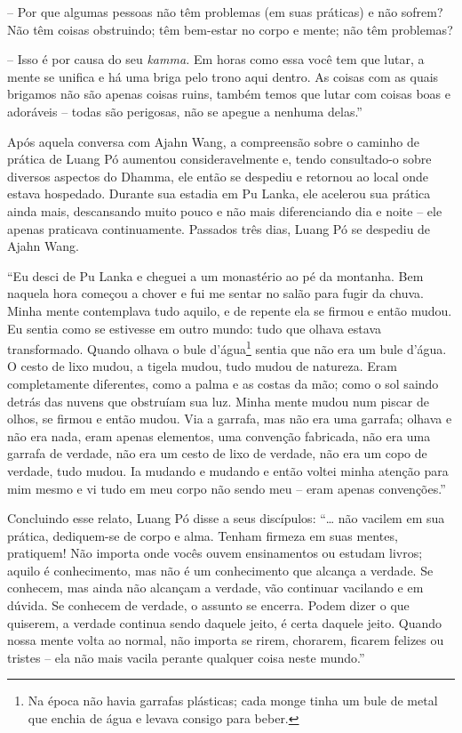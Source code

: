 -- Por que algumas pessoas não têm problemas (em suas práticas) e não
sofrem? Não têm coisas obstruindo; têm bem-estar no corpo e mente; não
têm problemas?

-- Isso é por causa do seu \emph{kamma.} Em horas como essa você tem que
lutar, a mente se unifica e há uma briga pelo trono aqui dentro. As
coisas com as quais brigamos não são apenas coisas ruins, também temos
que lutar com coisas boas e adoráveis -- todas são perigosas, não se
apegue a nenhuma delas.''

Após aquela conversa com Ajahn Wang, a compreensão sobre o caminho de
prática de Luang Pó aumentou consideravelmente e, tendo consultado-o
sobre diversos aspectos do Dhamma, ele então se despediu e retornou ao
local onde estava hospedado. Durante sua estadia em Pu Lanka, ele
acelerou sua prática ainda mais, descansando muito pouco e não mais
diferenciando dia e noite -- ele apenas praticava continuamente.
Passados três dias, Luang Pó se despediu de Ajahn Wang.

``Eu desci de Pu Lanka e cheguei a um monastério ao pé da montanha. Bem
naquela hora começou a chover e fui me sentar no salão para fugir da
chuva. Minha mente contemplava tudo aquilo, e de repente ela se firmou e
então mudou. Eu sentia como se estivesse em outro mundo: tudo que olhava
estava transformado. Quando olhava o bule d'água\footnote{Na época não
  havia garrafas plásticas; cada monge tinha um bule de metal que enchia
  de água e levava consigo para beber.} sentia que não era um bule
d'água. O cesto de lixo mudou, a tigela mudou, tudo mudou de natureza.
Eram completamente diferentes, como a palma e as costas da mão; como o
sol saindo detrás das nuvens que obstruíam sua luz. Minha mente mudou
num piscar de olhos, se firmou e então mudou. Via a garrafa, mas não era
uma garrafa; olhava e não era nada, eram apenas elementos, uma convenção
fabricada, não era uma garrafa de verdade, não era um cesto de lixo de
verdade, não era um copo de verdade, tudo mudou. Ia mudando e mudando e
então voltei minha atenção para mim mesmo e vi tudo em meu corpo não
sendo meu -- eram apenas convenções.''

Concluindo esse relato, Luang Pó disse a seus discípulos: ``\ldots{} não
vacilem em sua prática, dediquem-se de corpo e alma. Tenham firmeza em
suas mentes, pratiquem! Não importa onde vocês ouvem ensinamentos ou
estudam livros; aquilo é conhecimento, mas não é um conhecimento que
alcança a verdade. Se conhecem, mas ainda não alcançam a verdade, vão
continuar vacilando e em dúvida. Se conhecem de verdade, o assunto se
encerra. Podem dizer o que quiserem, a verdade continua sendo daquele
jeito, é certa daquele jeito. Quando nossa mente volta ao normal, não
importa se rirem, chorarem, ficarem felizes ou tristes -- ela não mais
vacila perante qualquer coisa neste mundo.''

